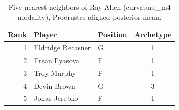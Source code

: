 \begin{table}[htbp]
  \centering\small
  \begin{tabular}{rllc}
    \toprule
    Rank & Player & Position & Archetype \\
    \midrule
    1 & Eldridge Recasner & G & 1 \\
    2 & Ersan Ilyasova & F & 1 \\
    3 & Troy Murphy & F & 1 \\
    4 & Devin Brown & G & 3 \\
    5 & Jonas Jerebko & F & 1 \\
    \bottomrule
  \end{tabular}
  \caption{Five nearest neighbors of Ray Allen (curvature_m4 modality), Procrustes-aligned posterior mean.}
  \label{tab:Ray_Allen_neighbors_curvature_m4}
\end{table}

